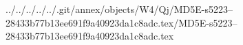 ../../../../../.git/annex/objects/W4/Qj/MD5E-s5223--28433b77b13ee691f9a40923da1c8adc.tex/MD5E-s5223--28433b77b13ee691f9a40923da1c8adc.tex